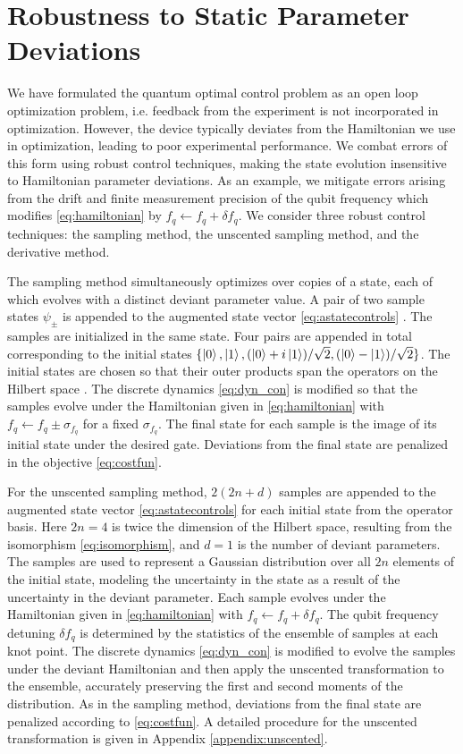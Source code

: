 \section{Robustness to Static Parameter Deviations \label{sec:static}}
 We have formulated the quantum optimal control
problem as an open loop optimization problem, i.e.
feedback from the experiment is not incorporated in optimization.
However, the device typically deviates from the Hamiltonian we use in optimization,
leading to poor experimental performance. We combat errors
of this form using robust control techniques,
making the state evolution insensitive
to Hamiltonian parameter deviations. As an example,
we mitigate errors arising from the drift and finite measurement
precision of the qubit frequency which modifies \eqref{eq:hamiltonian}
by $f_{q} \gets f_{q} + \delta f_{q}$.
We consider three robust control techniques:
the sampling method, the unscented sampling method,
and the derivative method.

The sampling method simultaneously optimizes over copies of a state,
each of which evolves with a distinct deviant parameter value.
A pair of two sample states $\psi_{\pm}$
is appended to the augmented state vector \eqref{eq:astatecontrols}
. The samples are initialized in the same state.
Four pairs
are appended in total corresponding to the initial states
$\{\ket{0}, \ket{1}, (\ket{0} + i\ket{1}) / \sqrt{2},
(\ket{0} - \ket{1}) / \sqrt{2}\}$.
The initial states are chosen
so that their outer products span the operators on the
Hilbert space  \cite{chow2009randomized}.
The discrete dynamics \eqref{eq:dyn_con} is modified so that the
samples evolve under the Hamiltonian given in \eqref{eq:hamiltonian}
with $f_{q} \gets f_{q} \pm \sigma_{f_{q}}$ for a fixed $\sigma_{f_{q}}$.
The final state
for each sample is the image of its initial state
under the desired gate. Deviations from the final state are
penalized in the objective \eqref{eq:costfun}.

For the unscented sampling method, $2(2n + d)$ samples
are appended to the augmented state vector \eqref{eq:astatecontrols}
for each initial state from the operator basis. Here $2n = 4$ is twice the
dimension of the Hilbert space, resulting from the isomorphism \eqref{eq:isomorphism},
and $d = 1$ is the number of deviant parameters. The samples
are used to represent a Gaussian distribution over all $2n$
elements of the initial state, modeling
the uncertainty in the state as a result of the uncertainty in
the deviant parameter. Each sample evolves under the Hamiltonian
given in \eqref{eq:hamiltonian} with $f_{q} \gets f_{q} + \delta f_{q}$.
The qubit frequency detuning $\delta f_{q}$ is determined by the statistics
of the ensemble of samples at each knot point.
The discrete dynamics \eqref{eq:dyn_con} is modified to 
evolve the samples under the deviant Hamiltonian
and then apply the unscented transformation to the ensemble,
accurately preserving the first and second moments
of the distribution.
As in the sampling method,
deviations from the final state are penalized according to \eqref{eq:costfun}.
A detailed procedure for the unscented transformation is given
in Appendix \ref{appendix:unscented}.


